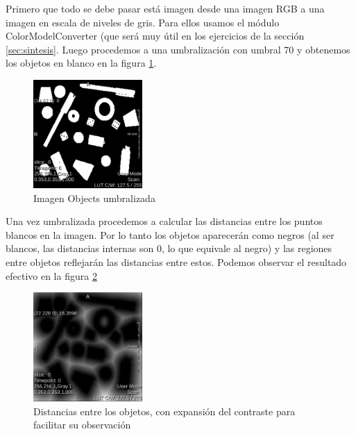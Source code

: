 \documentclass{article}
\begin{document}
\begin{par}
Primero que todo se debe pasar est\'{a} imagen desde una imagen RGB a una imagen en escala de niveles de gris. Para ellos usamos el m\'{o}dulo ColorModelConverter (que ser\'{a} muy \'{u}til en los ejercicios de la secci\'{o}n \ref{sec:sintesis}. Luego procedemos a una umbralizaci\'{o}n con umbral 70 y obtenemos los objetos en blanco en la figura \ref{fg:2_umbr}.
\end{par}

\begin{figure}[ht]
\begin{center}
\includegraphics[width=0.37\textwidth]{2Distancia/2_umbr} %
\caption{Imagen Objects umbralizada}
\label{fg:2_umbr}
\end{center}
\end{figure}
\FloatBarrier

\begin{par}
Una vez umbralizada procedemos a calcular las distancias entre los puntos blancos en la imagen. Por lo tanto los objetos aparecer\'{a}n como negros (al ser blancos, las distancias internas son 0, lo que equivale al negro) y las regiones entre objetos reflejar\'{a}n las distancias entre estos. Podemos observar el resultado efectivo en la figura \ref{fg:2_dist}
\end{par}

\begin{figure}[ht]
\begin{center}
\includegraphics[width=0.37\textwidth]{2Distancia/2_dist} %
\caption{Distancias entre los objetos, con expansi\'{o}n del contraste para facilitar su observaci\'{o}n}
\label{fg:2_dist}
\end{center}
\end{figure}
\FloatBarrier
\end{document}
